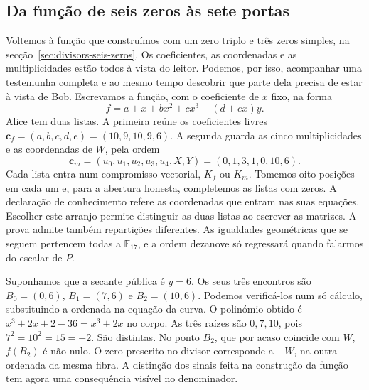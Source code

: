 \subsection{Da função de seis zeros às sete portas}
\label{sec:gbp-sete-portas}

Voltemos à função que construímos com um zero triplo e três zeros
simples, na secção~\ref{sec:divisors-seis-zeros}. Os coeficientes,
as coordenadas e as multiplicidades estão todos à vista do leitor.
Podemos, por isso, acompanhar uma testemunha completa e ao mesmo
tempo descobrir que parte dela precisa de estar à vista de Bob.
Escrevamos a função, com o coeficiente de \(x\) fixo, na forma
\[
       f=a+x+bx^2+cx^3+(d+ex)y .
\]
Alice tem duas listas. A primeira reúne os coeficientes livres
\(\boldsymbol c_f=(a,b,c,d,e)=(10,9,10,9,6)\). A segunda
guarda as cinco multiplicidades e as coordenadas de \(W\), pela ordem
\[
 \boldsymbol c_m=(u_0,u_1,u_2,u_3,u_4,X,Y)
                   =(0,1,3,1,0,10,6).
\]
Cada lista entra num compromisso vectorial, \(K_f\) ou \(K_m\).
Tomemos oito posições em cada um e, para a abertura honesta,
completemos as listas com zeros. A declaração de conhecimento
refere as coordenadas que entram nas suas equações. Escolher este
arranjo permite distinguir as duas listas ao escrever as matrizes.
A prova admite também repartições diferentes. As igualdades
geométricas que se seguem pertencem todas a \(\mathbb F_{17}\), e
a ordem dezanove só regressará quando falarmos do escalar de \(P\).

Suponhamos que a secante pública é \(y=6\). Os seus três encontros
são \(B_0=(0,6)\), \(B_1=(7,6)\) e \(B_2=(10,6)\).
Podemos verificá-los num só cálculo, substituindo a ordenada na
equação da curva. O polinómio obtido é \(x^3+2x+2-36=x^3+2x\)
no corpo. As três raízes são \(0,7,10\), pois
\(7^2=10^2=15=-2\). São distintas. No ponto \(B_2\), que por
acaso coincide com \(W\), \(f(B_2)\) é não nulo. O zero
prescrito no divisor corresponde a \(-W\), na outra ordenada da
mesma fibra. A distinção dos sinais feita na construção da função
tem agora uma consequência visível no denominador.

